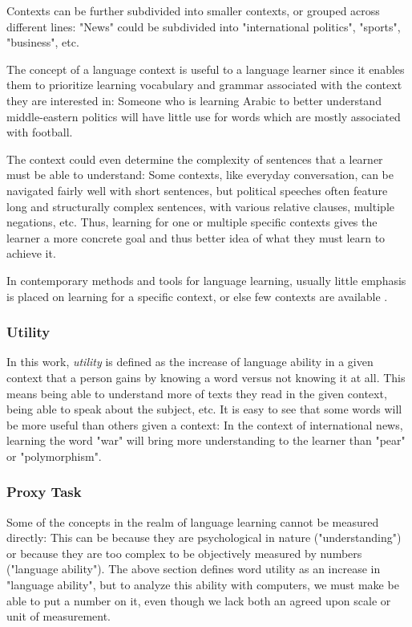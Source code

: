 Contexts can be further subdivided into smaller contexts, or grouped across different lines:
"News" could be subdivided into "international politics", "sports", "business", etc.

The concept of a language context is useful to a language learner since it enables them to prioritize learning vocabulary and grammar associated with the context they are interested in:
Someone who is learning Arabic to better understand middle-eastern politics will have little use for words which are mostly associated with football.

The context could even determine the complexity of sentences that a learner must be able to understand:
Some contexts, like everyday conversation, can be navigated fairly well with short sentences, but political speeches often feature long and structurally complex sentences, with various relative clauses, multiple negations, etc.
Thus, learning for one or multiple specific contexts gives the learner a more concrete goal and thus better idea of what they must learn to achieve it.

In contemporary methods and tools for language learning, usually little emphasis is placed on learning for a specific context, or else few contexts are available .

\subsubsection{Utility}
In this work, \textit{utility} is defined as the increase of language ability in a given context that a person gains by knowing a word versus not knowing it at all.
This means being able to understand more of texts they read in the given context, being able to speak about the subject, etc.
It is easy to see that some words will be more useful than others given a context:
In the context of international news, learning the word "war" will bring more understanding to the learner than "pear" or "polymorphism".

\subsubsection{Proxy Task}
Some of the concepts in the realm of language learning cannot be measured directly:
This can be because they are psychological in nature ("understanding") or because they are too complex to be objectively measured by numbers ("language ability").
The above section defines word utility as an increase in "language ability", but to analyze this ability with computers, we must make be able to put a number on it, even though we lack both an agreed upon scale or unit of measurement.

